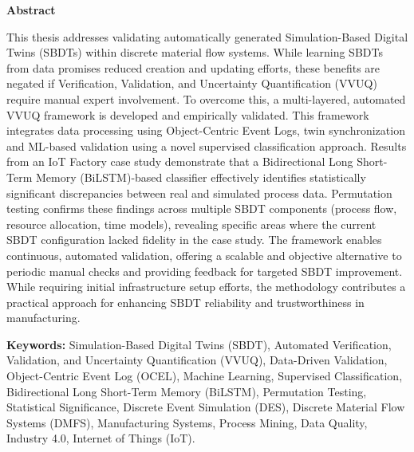 \thispagestyle{plain} %

\vspace*{1.5in} %

\begin{center}
  {\Large \textbf{Abstract}}
\end{center}

This thesis addresses validating automatically generated Simulation-Based Digital Twins (SBDTs) within discrete material flow systems. While learning SBDTs from data promises reduced creation and updating efforts, these benefits are negated if Verification, Validation, and Uncertainty Quantification (VVUQ) require manual expert involvement. To overcome this, a multi-layered, automated VVUQ framework is developed and empirically validated. This framework integrates data processing using Object-Centric Event Logs, twin synchronization and ML-based validation using a novel supervised classification approach. Results from an IoT Factory case study demonstrate that a Bidirectional Long Short-Term Memory (BiLSTM)-based classifier effectively identifies statistically significant discrepancies between real and simulated process data. Permutation testing confirms these findings across multiple SBDT components (process flow, resource allocation, time models), revealing specific areas where the current SBDT configuration lacked fidelity in the case study. The framework enables continuous, automated validation, offering a scalable and objective alternative to periodic manual checks and providing feedback for targeted SBDT improvement. While requiring initial infrastructure setup efforts, the methodology contributes a practical approach for enhancing SBDT reliability and trustworthiness in manufacturing.
\medskip

\vspace{1in}

\textbf{Keywords:} Simulation-Based Digital Twins (SBDT), Automated Verification, Validation, and Uncertainty Quantification (VVUQ), Data-Driven Validation, Object-Centric Event Log (OCEL), Machine Learning, Supervised Classification, Bidirectional Long Short-Term Memory (BiLSTM), Permutation Testing, Statistical Significance, Discrete Event Simulation (DES), Discrete Material Flow Systems (DMFS), Manufacturing Systems, Process Mining, Data Quality, Industry 4.0, Internet of Things (IoT).

\clearpage
